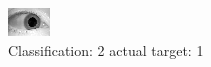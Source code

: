 \begin{figure}[h!]
\begin{center}
\includegraphics[width=0.60\columnwidth]{figures/ID1517_class_2_target_1.png}
\end{center}
\caption{ Classification: 2 actual target: 1}
\label{fig:ID1517_class_2_target_1}
\end{figure}
